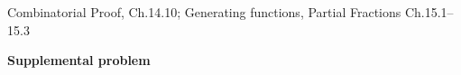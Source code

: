 \documentclass[handout]{mcs}
\begin{document}

\begin{staffnotes}
Combinatorial Proof, Ch.14.10;   Generating functions,
Partial Fractions Ch.15.1--15.3
\end{staffnotes}



\begin{center}
\textbf{\large Supplemental problem}
\end{center}




\end{document}

